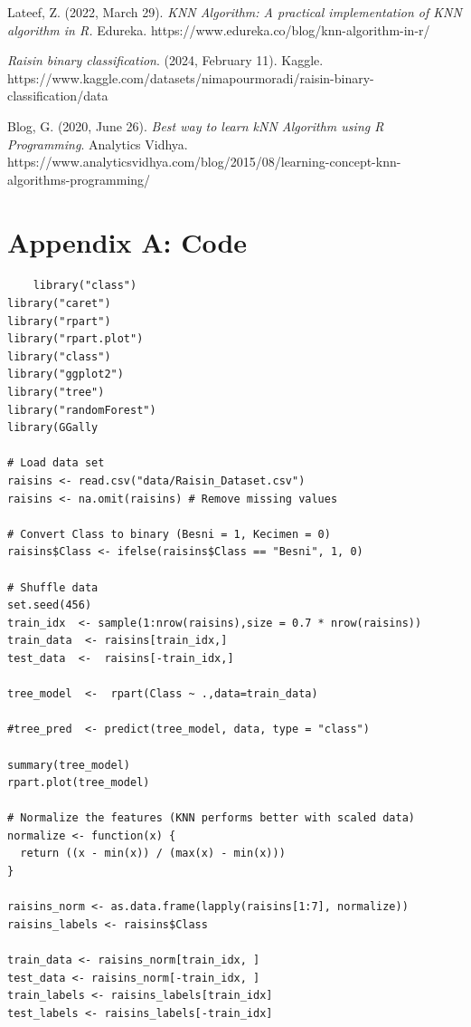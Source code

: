 \documentclass{article}
\begin{document}
\begin{thebibliography}{9}

Lateef, Z. (2022, March 29). \emph{KNN Algorithm: A practical implementation of KNN algorithm in R.} Edureka. https://www.edureka.co/blog/knn-algorithm-in-r/

\emph{Raisin binary classification}. (2024, February 11). Kaggle. https://www.kaggle.com/datasets/nimapourmoradi/raisin-binary-classification/data


Blog, G. (2020, June 26). \emph{Best way to learn kNN Algorithm using R Programming}. Analytics Vidhya. https://www.analyticsvidhya.com/blog/2015/08/learning-concept-knn-algorithms-programming/

\newpage

\section{Appendix A: Code}

\begin{verbatim}
    library("class")
library("caret")
library("rpart")
library("rpart.plot")
library("class")
library("ggplot2")
library("tree")
library("randomForest")
library(GGally

# Load data set
raisins <- read.csv("data/Raisin_Dataset.csv")
raisins <- na.omit(raisins) # Remove missing values

# Convert Class to binary (Besni = 1, Kecimen = 0)
raisins$Class <- ifelse(raisins$Class == "Besni", 1, 0)

# Shuffle data
set.seed(456)
train_idx  <- sample(1:nrow(raisins),size = 0.7 * nrow(raisins))
train_data  <- raisins[train_idx,]
test_data  <-  raisins[-train_idx,]

tree_model  <-  rpart(Class ~ .,data=train_data)

#tree_pred  <- predict(tree_model, data, type = "class")

summary(tree_model)
rpart.plot(tree_model)

# Normalize the features (KNN performs better with scaled data)
normalize <- function(x) {
  return ((x - min(x)) / (max(x) - min(x)))
}

raisins_norm <- as.data.frame(lapply(raisins[1:7], normalize))
raisins_labels <- raisins$Class

train_data <- raisins_norm[train_idx, ]
test_data <- raisins_norm[-train_idx, ]
train_labels <- raisins_labels[train_idx]
test_labels <- raisins_labels[-train_idx]


\end{verbatim}
\end{thebibliography}
\end{document}
